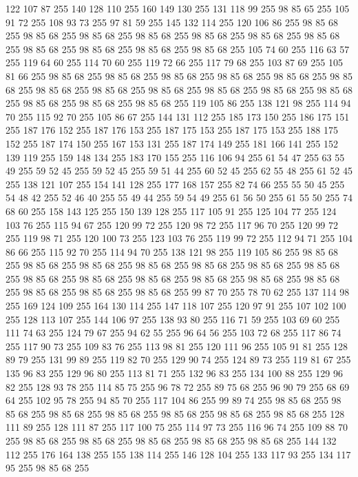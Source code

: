 122 107 87 255 140 128 110 255 160 149 130 255 131 118 99 255 98 85 65 255 105 91 72 255 108 93 73 255 97 81 59 255 145 132 114 255 120 106 86 255 98 85 68 255 98 85 68 255 98 85 68 255 98 85 68 255 98 85 68 255 98 85 68 255 98 85 68 255 98 85 68 255 98 85 68 255 98 85 68 255 98 85 68 255 105 74 60 255 116 63 57 255 119 64 60 255 114 70 60 255 119 72 66 255 117 79 68 255 103 87 69 255 105 81 66 255 98 85 68 255 98 85 68 255 98 85 68 255 98 85 68 255 98 85 68 255 98 85 68 255 98 85 68 255 98 85 68 255 98 85 68 255 98 85 68 255 98 85 68 255 98 85 68 255 98 85 68 255 98 85 68 255 98 85 68 255 119 105 86 255 138 121 98 255 114 94 70 255 115 92 70 255 105 86 67 255 144 131 112 255 185 173 150 255 186 175 151 255 187 176 152 255 187 176 153 255 187 175 153 255 187 175 153 255 188 175 152 255 187 174 150 255 167 153 131 255 187 174 149 255 181 166 141 255 152 139 119 255 159 148 134 255 183 170 155 255
116 106 94 255 61 54 47 255 63 55 49 255 59 52 45 255 59 52 45 255 59 51 44 255 60 52 45 255 62 55 48 255 61 52 45 255 138 121 107 255 154 141 128 255 177 168 157 255 82 74 66 255 55 50 45 255 54 48 42 255 52 46 40 255 55 49 44 255 59 54 49 255 61 56 50 255 61 55 50 255 74 68 60 255 158 143 125 255 150 139 128 255 117 105 91 255 125 104 77 255 124 103 76 255 115 94 67 255 120 99 72 255 120 98 72 255 117 96 70 255 120 99 72 255 119 98 71 255 120 100 73 255 123 103 76 255 119 99 72 255 112 94 71 255 104 86 66 255 115 92 70 255 114 94 70 255 138 121 98 255 119 105 86 255 98 85 68 255 98 85 68 255 98 85 68 255 98 85 68 255 98 85 68 255 98 85 68 255 98 85 68 255 98 85 68 255 98 85 68 255 98 85 68 255 98 85 68 255 98 85 68 255 98 85 68 255 98 85 68 255 98 85 68 255 98 85 68 255 99 87 70 255 78 70 62 255 137 114 98 255 169 124 109 255 164 130 114 255 147 118 107 255 120 97 91 255
107 102 100 255 128 113 107 255 144 106 97 255 138 93 80 255 116 71 59 255 103 69 60 255 111 74 63 255 124 79 67 255 94 62 55 255 96 64 56 255 103 72 68 255 117 86 74 255 117 90 73 255 109 83 76 255 113 98 81 255 120 111 96 255 105 91 81 255 128 89 79 255 131 99 89 255 119 82 70 255 129 90 74 255 124 89 73 255 119 81 67 255 135 96 83 255 129 96 80 255 113 81 71 255 132 96 83 255 134 100 88 255 129 96 82 255 128 93 78 255 114 85 75 255 96 78 72 255 89 75 68 255 96 90 79 255 68 69 64 255 102 95 78 255 94 85 70 255 117 104 86 255 99 89 74 255 98 85 68 255 98 85 68 255 98 85 68 255 98 85 68 255 98 85 68 255 98 85 68 255 98 85 68 255 128 111 89 255 128 111 87 255 117 100 75 255 114 97 73 255 116 96 74 255 109 88 70 255 98 85 68 255 98 85 68 255 98 85 68 255 98 85 68 255 98 85 68 255 144 132 112 255 176 164 138 255 155 138 114 255 146 128 104 255 133 117 93 255 134 117 95 255 98 85 68 255
